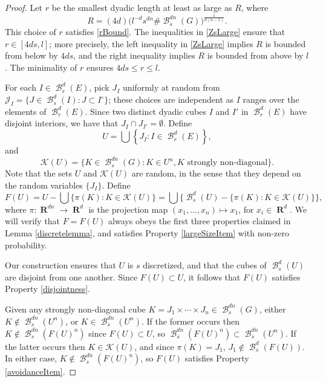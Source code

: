 \documentclass[dvipsnames,letterpaper,12pt]{article}
\numberwithin{equation}{section}
\theoremstyle{plain}
\theoremstyle{remark}
\DeclareMathOperator{\RR}{\mathbf{R}}
\DeclareMathOperator{\setcolon}{\colon}
\DeclareMathOperator{\B}{\mathcal{B}}
\begin{document}
\begin{proof}
	Let $r$ be the smallest dyadic length at least as large as $R$, where
	\begin{equation} \label{What-is-r}
		R = (4d) \big( l^{-d} s^{dn}\# \B^{dn}_s(G)\big)^{\frac{1}{d(n-1)}}.
	\end{equation}
	This choice of $r$ satisfies \eqref{rBound}. 
	The inequalities in \eqref{ZsLarge} ensure that $r \in [4ds,l]$; more precisely, the left inequality in \eqref{ZsLarge} implies $R$ is bounded from below by $4ds$, and the right inequality implies $R$ is bounded from above by $l$. The minimality of $r$ ensures $4ds \leq r \leq l$.

	For each $I \in \B_r^d(E)$, pick $J_I$ uniformly at random from $\mathcal{J}_I = \{ J \in \B^d_s(I) : J \subset I^\circ \}$; these choices are independent as $I$ ranges over the elements of $\B_r^d(E)$. Since two distinct dyadic cubes $I$ and $I'$ in $\B_r^d(E)$ have disjoint interiors, we have that $J_I \cap J_{I'} = \emptyset$. Define
	\[ 	U = \bigcup \left\{ J_I \setcolon I \in \B_r^d(E) \right\}, \]
	and
	\[ \mathcal{K}(U) = \{ K \in \B^{dn}_s(G) \setcolon K \in U^n, \text{$K$ strongly non-diagonal} \}. \]
	Note that the sets $U$ and $\mathcal{K}(U)$ are random, in the sense that they depend on the random variables $\{ J_I \}$. Define
	\begin{equation} \label{defnOfF}
		F(U) = U - \bigcup \{ \pi(K) \setcolon K \in \mathcal{K}(U) \} = \bigcup \Big\{ \B^d_s(U) - \{ \pi(K) \setcolon K \in \mathcal{K}(U) \} \Big\},
	\end{equation}
	where $\pi \colon \RR^{dn} \to \RR^d$ is the projection map $(x_1, \dots, x_n) \mapsto x_1$, for $x_i \in \RR^d$. We will verify that $F = F(U)$ always obeys the first three properties claimed in Lemma \ref{discretelemma}, and satisfies Property \ref{largeSizeItem} with non-zero probability.
	
	Our construction ensures that $U$ is $s$ discretized, and that the cubes of $\B^d_s(U)$ are disjoint from one another. Since $F(U) \subset U$, it follows that $F(U)$ satisfies Property \ref{disjointness}. 
	
	Given any strongly non-diagonal cube $K = J_1 \times \cdots \times J_n \in \B_s^{dn}(G)$, either $K \not \in \B_s^{dn}(U^n)$, or $K \in \B_s^{dn}(U^n)$. If the former occurs then $K \not \in \B_s^{dn}(F(U)^n)$ since $F(U) \subset U$, so $\B_s^{dn}(F(U)^n) \subset \B_s^{dn}(U^n)$. If the latter occurs then $K \in \mathcal{K}(U)$, and since $\pi(K) = J_1$, $J_1 \not \in \B_s^d(F(U))$. In either case, $K \not \in \B_s^{dn}(F(U)^n)$, so $F(U)$ satisfies Property \ref{avoidanceItem}. 
	

\end{proof}
\end{document}
